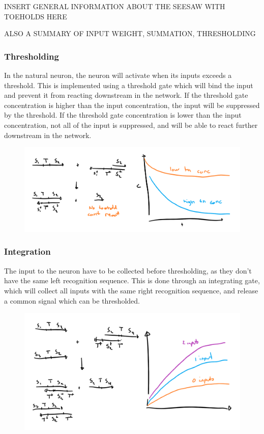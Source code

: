 INSERT GENERAL INFORMATION ABOUT THE SEESAW WITH TOEHOLDS HERE

ALSO A SUMMARY OF INPUT WEIGHT, SUMMATION, THRESHOLDING

\subsubsection{Thresholding}
In the natural neuron, the neuron will activate when its inputs exceeds a threshold. This is implemented using a threshold gate which will bind the input and prevent it from reacting downstream in the network. If the threshold gate concentration is higher than the input concentration, the input will be suppressed by the threshold. If the threshold gate concentration is lower than the input concentration, not all of the input is suppressed, and will be able to react further downstream in the network.

\begin{figure}[H]
\centering
\includegraphics[width=\columnwidth]{images/seesaw_threshold.png}
\caption{}
\label{seesaw_threshold}
\end{figure}

\subsubsection{Integration}
The input to the neuron have to be collected before thresholding, as they don't have the same left recognition sequence. This is done through an integrating gate, which will collect all inputs with the same right recognition sequence, and release a common signal which can be thresholded.

\begin{figure}[H]
\centering
\includegraphics[width=\columnwidth]{images/seesaw_integration.png}
\caption{}
\label{seesaw_integration}
\end{figure}

